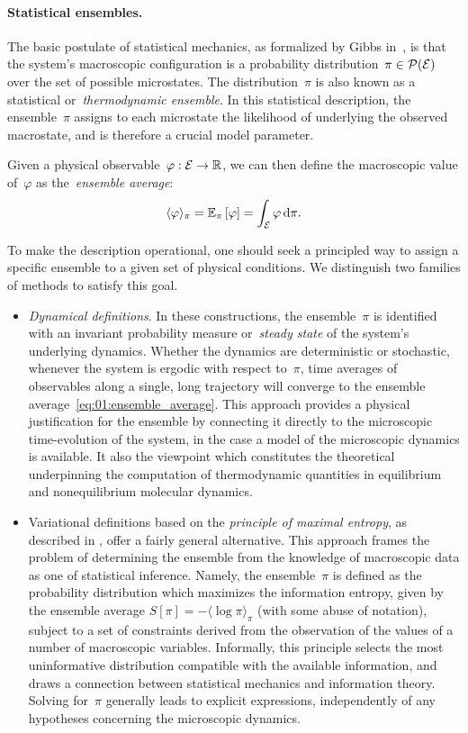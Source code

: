 \paragraph{Statistical ensembles.}
The basic postulate of statistical mechanics, as formalized by Gibbs in~\cite{G02}, is that the system's macroscopic configuration is a probability distribution~${\pi\in\mathcal{P}(\mathcal{E})}$ over the set of possible microstates.
The distribution~$\pi$ is also known as a statistical or~\textit{thermodynamic ensemble}. In this statistical description, the ensemble~$\pi$ assigns to each microstate the likelihood of underlying the observed macrostate, and is therefore a crucial model parameter.

Given a physical observable~$\varphi:\mathcal{E}\to\mathbb{R}$, we can then define the macroscopic value of~$\varphi$ as the~\textit{ensemble average}:
\begin{equation}
    \label{eq:01:ensemble_average}
    \langle \varphi\rangle_{\pi} = \mathbb{E}_\pi\left[\varphi\right]= \int_{\mathcal{E}}\varphi\,\mathrm{d} \pi.
\end{equation}

To make the description operational, one should seek a principled way to assign a specific ensemble to a given set of physical conditions.
We distinguish two families of methods to satisfy this goal.

\begin{itemize}
    \item{\textit{Dynamical definitions}. In these constructions, the ensemble~$\pi$ is identified with an invariant probability measure or~\textit{steady state} of the system's underlying dynamics.
    Whether the dynamics are deterministic or stochastic, whenever the system is ergodic with respect to~$\pi$, time averages of observables along a single, long trajectory will converge to the ensemble average~\eqref{eq:01:ensemble_average}.
    This approach provides a physical justification for the ensemble by connecting it directly to the microscopic time-evolution of the system, in the case a model of the microscopic dynamics is available.
    It also the viewpoint which constitutes the theoretical underpinning the computation of thermodynamic quantities in equilibrium and nonequilibrium molecular dynamics.
    }
    \item{Variational definitions based on the \textit{principle of maximal entropy}, as described in \cite{J57a,J57b}, offer a fairly general alternative.
    This approach frames the problem of determining the ensemble from the knowledge of macroscopic data as one of statistical inference.
    Namely, the ensemble~$\pi$ is defined as the probability distribution which maximizes the information entropy, given by the ensemble average $S[\pi] = -\langle\log\pi\rangle_\pi$ (with some abuse of notation), subject to a set of constraints derived from the observation of the values of a number of macroscopic variables.
    Informally, this principle selects the most uninformative distribution compatible with the available information, and draws a connection between statistical mechanics and information theory. Solving for~$\pi$ generally leads to explicit expressions, independently of any hypotheses concerning the microscopic dynamics.}
\end{itemize}

